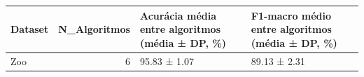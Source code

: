 \begin{tabular}{lrll}
\toprule
Dataset & N\_Algoritmos & Acurácia média entre algoritmos (média ± DP, \%) & F1-macro médio entre algoritmos (média ± DP, \%) \\
\midrule
Zoo & 6 & 95.83 ± 1.07 & 89.13 ± 2.31 \\
\bottomrule
\end{tabular}
